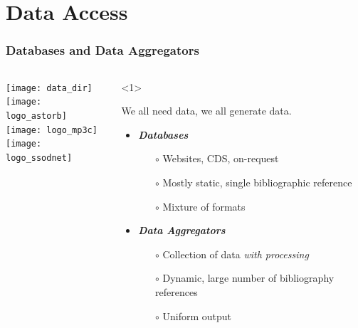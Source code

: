 \section{Data Access}
\label{sec:databases}

\begin{frame}
  \frametitle{Databases and Data Aggregators}

  \begin{columns}[T]

      \begin{column}{.3\textwidth}
        \vspace{0.5em}\texttt{[image: data\_dir]}\\
        \vspace{0.5em}\texttt{[image: logo\_astorb]}\\
        \vspace{0.5em}\texttt{[image: logo\_mp3c]}\\
        \vspace{0.5em}\texttt{[image: logo\_ssodnet]}\\
      \end{column}


    \begin{column}{.7\textwidth}
      \begin{overlayarea}{\textwidth}{\textheight}
        \begin{onlyenv}<1>

          \vspace{1em}
          We all need data, we all generate data.\\
          \vspace{1em}
          \begin{itemize}[<.->]
            \item \emph{\bf Databases}
              \begin{itemize}[<.->]
                \item[$\circ$] Websites, CDS, on-request
                \item[$\circ$] Mostly static, single bibliographic reference
                \item[$\circ$] Mixture of formats
              \end{itemize}

            \vspace{0.5em}
            \item \emph{\bf Data Aggregators}
              \begin{itemize}[<.->]
                \item[$\circ$] Collection of data \emph{with processing}
                \item[$\circ$] Dynamic, large number of bibliography references
                \item[$\circ$] Uniform output
              \end{itemize}


\end{itemize}
\end{onlyenv}
\end{overlayarea}
\end{column}
\end{columns}
\end{frame}
